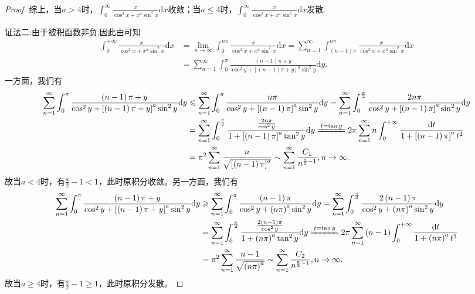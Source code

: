 \documentclass[../../main.tex]{subfiles}%
\begin{document}
\begin{proof}
综上，当$a>4$时，$\int_0^{\infty}\frac{x}{\cos^2x+x^a\sin^2x}\mathrm{d}x$收敛；当$a\leqslant 4$时，$\int_0^{\infty}\frac{x}{\cos^2x+x^a\sin^2x}\mathrm{d}x$发散.

{\color{blue}证法二:}由于被积函数非负,因此由可知
\begin{align*}
\int_0^{+\infty}{\frac{x}{\cos ^2x+x^a\sin ^2x}\mathrm{d}x}&=\underset{n\rightarrow \infty}{\lim}\int_0^{n\pi}{\frac{x}{\cos ^2x+x^a\sin ^2x}\mathrm{d}x}
=\sum_{n=1}^{\infty}{\int_{\left( n-1 \right) \pi}^{n\pi}{\frac{x}{\cos ^2x+x^a\sin ^2x}\mathrm{d}x}}
\\
&=\sum_{n=1}^{\infty}{\int_0^{\pi}{\frac{\left( n-1 \right) \pi +y}{\cos ^2y+\left[ \left( n-1 \right) \pi +y \right] ^a\sin ^2y}\mathrm{d}y}}.
\end{align*}
一方面，我们有
\begin{align*}
\sum_{n=1}^{\infty}{\int_0^{\pi}{\frac{\left( n-1 \right) \pi +y}{\cos ^2y+\left[ \left( n-1 \right) \pi +y \right] ^a\sin ^2y}\mathrm{d}y}}&\leqslant \sum_{n=1}^{\infty}{\int_0^{\pi}{\frac{n\pi}{\cos ^2y+\left[ \left( n-1 \right) \pi \right] ^a\sin ^2y}\mathrm{d}y}} =\sum_{n=1}^{\infty}{\int_0^{\frac{\pi}{2}}{\frac{2n\pi}{\cos ^2y+\left[ \left( n-1 \right) \pi \right] ^a\sin ^2y}\mathrm{d}y}}\\
&=\sum_{n=1}^{\infty}{\int_0^{\frac{\pi}{2}}{\frac{\frac{2n\pi}{\cos ^2y}}{1+\left[ \left( n-1 \right) \pi \right] ^a\tan ^2y}\mathrm{d}y}}
\xlongequal{t=\tan y}2\pi \sum_{n=1}^{\infty}{n\int_0^{+\infty}{\frac{\mathrm{d}t}{1+\left[ \left( n-1 \right) \pi \right] ^at^2}}}\\
&=\pi ^2\sum_{n=1}^{\infty}{\frac{n}{\sqrt{\left[ \left( n-1 \right) \pi \right] ^a}}}\sim \sum_{n=1}^{\infty}{\frac{C_1}{n^{\frac{a}{2}-1}}},n\rightarrow \infty .
\end{align*}
故当$a<4$时，有$\frac{a}{2}-1<1$，此时原积分收敛。另一方面，我们有
\begin{align*}
\sum_{n=1}^{\infty}{\int_0^{\pi}{\frac{\left( n-1 \right) \pi +y}{\cos ^2y+\left[ \left( n-1 \right) \pi +y \right] ^a\sin ^2y}\mathrm{d}y}}&\geqslant \sum_{n=1}^{\infty}{\int_0^{\pi}{\frac{\left( n-1 \right) \pi}{\cos ^2y+\left( n\pi \right) ^a\sin ^2y}\mathrm{d}y}}=\sum_{n=1}^{\infty}{\int_0^{\frac{\pi}{2}}{\frac{2\left( n-1 \right) \pi}{\cos ^2y+\left( n\pi \right) ^a\sin ^2y}\mathrm{d}y}}\\
&=\sum_{n=1}^{\infty}{\int_0^{\frac{\pi}{2}}{\frac{\frac{2\left( n-1 \right) \pi}{\cos ^2y}}{1+\left( n\pi \right) ^a\tan ^2y}\mathrm{d}y}}\xlongequal{t=\tan y}2\pi \sum_{n=1}^{\infty}{\left( n-1 \right) \int_0^{+\infty}{\frac{\mathrm{d}t}{1+\left( n\pi \right) ^at^2}}}\\
&=\pi ^2\sum_{n=1}^{\infty}{\frac{n-1}{\sqrt{\left( n\pi \right) ^a}}}\sim \sum_{n=1}^{\infty}{\frac{C_2}{n^{\frac{a}{2}-1}}},n\rightarrow \infty .
\end{align*}
故当$a\geqslant 4$时，有$\frac{a}{2}-1\geqslant 1$，此时原积分发散。

\end{proof}
\end{document}
